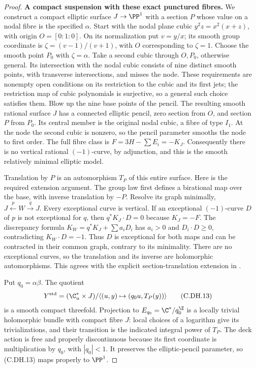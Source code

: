 \begin{proof}
\par\medskip\noindent\textbf{A compact suspension with these exact punctured fibres.}
We construct a compact elliptic
surface $J\to\PP^1$ with a
section $P$ whose value on a
nodal fibre is the specified
$\alpha$. Start with the
nodal plane cubic
$y^2z=x^2(x+z)$, with origin
$O=[0:1:0]$. On its
normalization put
$v=y/x$; its smooth group
coordinate is
$\zeta=(v-1)/(v+1)$,
with $O$ corresponding to
$\zeta=1$. Choose the
smooth point $P_0$ with
$\zeta=\alpha$.
Take a second cubic
through $O,P_0$, otherwise
general. Its intersection
with the nodal cubic
consists of nine distinct
smooth points, with
transverse intersections,
and misses the node.
These requirements are
nonempty open conditions
on its restriction to
the cubic and its first
jets; the restriction
map of cubic polynomials
is surjective, so a
general such choice
satisfies them.
Blow up the nine
base points of the
pencil. The resulting
smooth rational surface
$J$ has a connected
elliptic pencil, zero
section from $O$, and
section $P$ from $P_0$.
Its central member is
the original nodal
cubic, a fibre of type
$I_1$. At the node the
second cubic is nonzero,
so the pencil parameter
smooths the node to
first order. The full
fibre class is
$F=3H-\sum E_i=-K_J$.
Consequently there is
no vertical rational
$(-1)$-curve, by
adjunction, and this
is the smooth relatively
minimal elliptic model.

Translation by $P$ is an
automorphism $T_P$ of
this entire surface.
Here is the required
extension argument.
The group law first
defines a birational
map over the base,
with inverse translation
by $-P$. Resolve its
graph minimally,
$J\xleftarrow{p}W\xrightarrow{q}J$.
Every exceptional curve
is vertical. If an
exceptional $(-1)$-curve
$D$ of $p$ is not
exceptional for $q$,
then $q^*K_J\cdot D=0$
because $K_J=-F$.
The discrepancy formula
$K_W=q^*K_J+\sum a_iD_i$
has $a_i>0$ and
$D_i\cdot D\ge0$,
contradicting $K_W\cdot D=-1$.
Thus $D$ is exceptional
for both maps and can
be contracted in their
common graph, contrary
to its minimality.
There are no exceptional
curves, so the translation
and its inverse are
holomorphic automorphisms.
This agrees with the explicit
section-translation extension
in \cite[\S7.6]{SchuttShioda2010}.

Put $q_0=\alpha\beta$.
The quotient
\[
 Y^{\rm std}=(\C^*_u\times J)/
        \langle(u,y)\mapsto(q_0u,T_P(y))\rangle
                                                               \tag{C.DH.13}
\]
is a smooth compact
threefold. Projection to
$E_{q_0}=\C^*/q_0^{\Z}$
is a locally trivial
holomorphic bundle with
compact fibre $J$:
local choices of a
logarithm give its
trivializations, and
their transition is
the indicated integral
power of $T_P$.
The deck action is
free and properly
discontinuous because
its first coordinate
is multiplication by
$q_0$, with $|q_0|<1$.
It preserves the
elliptic-pencil parameter,
so (C.DH.13) maps
properly to $\PP^1$.


\end{proof}
